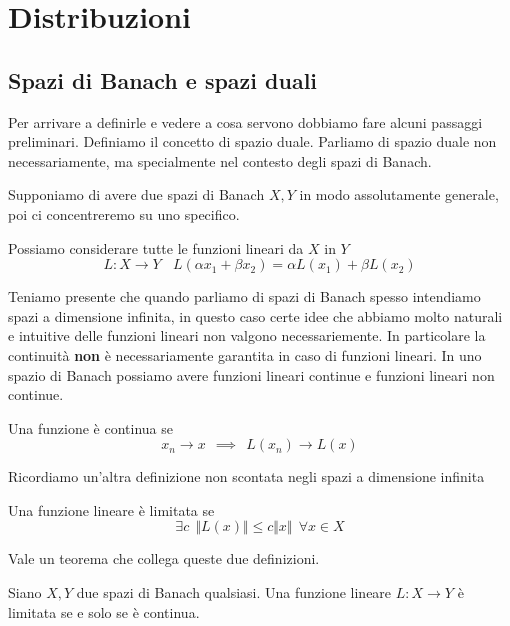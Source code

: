 \chapter{Distribuzioni}

\section{Spazi di Banach e spazi duali}

Per arrivare a definirle e vedere a cosa servono dobbiamo fare alcuni passaggi preliminari. Definiamo il concetto di spazio duale. Parliamo di spazio duale non necessariamente, ma specialmente nel contesto degli spazi di Banach.

Supponiamo di avere due spazi di Banach $X, Y$ in modo assolutamente generale, poi ci concentreremo su uno specifico.
\begin{defn}
[Linearità] Possiamo considerare tutte le funzioni lineari da $X$ in $Y$
\begin{equation*}
L: X\rightarrow Y\ \ \ \ L(\alpha x_{1} + \beta x_{2}) = \alpha L(x_{1}) + \beta L(x_{2})
\end{equation*}
\end{defn}
Teniamo presente che quando parliamo di spazi di Banach spesso intendiamo spazi a dimensione infinita, in questo caso certe idee che abbiamo molto naturali e intuitive delle funzioni lineari non valgono necessariemente. In particolare la continuità \textbf{non} è necessariamente garantita in caso di funzioni lineari. In uno spazio di Banach possiamo avere funzioni lineari continue e funzioni lineari non continue.
\begin{defn}
[Continuità] Una funzione è continua se
\begin{equation*}
x_{n}\rightarrow x\ \ \implies \ \ L(x_{n})\rightarrow L(x)
\end{equation*}
\end{defn}
Ricordiamo un'altra definizione non scontata negli spazi a dimensione infinita
\begin{defn}
[Limitatezza]
Una funzione lineare è limitata se
\begin{equation*}
\exists c\ \ \Vert L(x) \Vert \leq c \Vert x \Vert \ \ \forall x\in X
\end{equation*}
\end{defn}
Vale un teorema che collega queste due definizioni.
\begin{thm}
Siano $X, Y$ due spazi di Banach qualsiasi. Una funzione lineare $L: X\rightarrow Y$ è limitata se e solo se è continua.
\end{thm}
